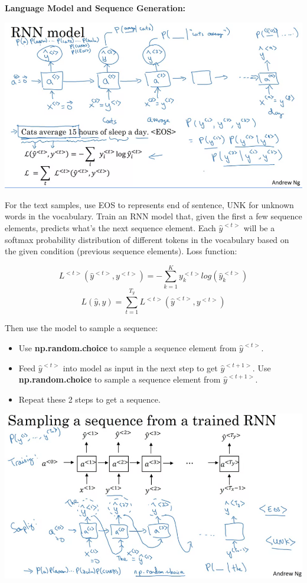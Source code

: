 \documentclass{article}
\begin{document}
\noindent \textbf{Language Model and Sequence Generation:}

\begin{center}
\includegraphics[scale=0.3]{./images/sequence_generation_rnn.png}
\end{center}

\noindent For the text samples, use EOS to represents end of sentence, UNK for unknown words in the vocabulary. Train an RNN model that, given the first a few sequence elements, predicts what's the next sequence element. Each \(\hat{y}^{<t>}\) will be a softmax probability distribution of different tokens in the vocabulary based on the given condition (previous sequence elements). Loss function:

\[L^{<t>}(\hat{y}^{<t>}, y^{<t>}) = - \sum_{k = 1}^{K} y_{k}^{<t>} log(\hat{y}_{k}^{<t>})\]
\[L(\hat{y}, y) = \sum_{t = 1}^{T_{y}} L^{<t>}(\hat{y}^{<t>}, y^{<t>})\]

\noindent Then use the model to sample a sequence:

\begin{itemize}
    \item Use \textbf{np.random.choice} to sample a sequence element from \(\hat{y}^{<t>}\).
    \item Feed \(\hat{y}^{<t>}\) into model as input in the next step to get \(\hat{y}^{<t + 1>}\). Use \textbf{np.random.choice} to sample a sequence element from \(\hat{y}^{<t + 1>}\).
    \item Repeat these 2 steps to get a sequence.
\end{itemize}

\begin{center}
\includegraphics[scale=0.3]{./images/sequence_sample_rnn.png}
\end{center}
\end{document}
